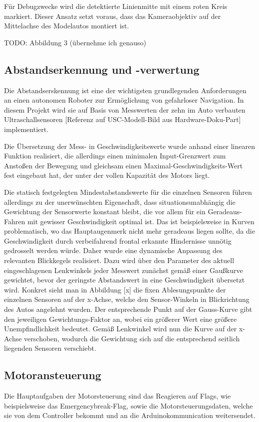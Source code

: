 \documentclass[12pt,a4paper]{report}
\begin{document}
Für Debugzwecke wird die detektierte Linienmitte mit einem roten Kreis markiert.
Dieser Ansatz setzt voraus, dass das Kameraobjektiv auf der Mittelachse des Modelautos montiert ist.

TODO: Abbildung 3 (übernehme ich genauso)
 

\subsection{Abstandserkennung und -verwertung}
Die Abstandserskennung ist eine der wichtigsten grundlegenden Anforderungen an einen autonomen Roboter zur Ermöglichung von gefahrloser Navigation. In diesem Projekt wird sie auf Basis von Messwerten der zehn im Auto verbauten Ultraschallsensoren [Referenz auf USC-Modell-Bild aus Hardware-Doku-Part] implementiert.

Die Übersetzung der Mess- in Geschwindigkeitswerte wurde anhand einer linearen Funktion realisiert, die allerdings einen minimalen Input-Grenzwert zum Anstoßen der Bewegung und gleichsam einen Maximal-Geschwindigkeits-Wert fest eingebaut hat, der unter der vollen Kapazität des Motors liegt.

Die statisch festgelegten Mindestabstandswerte für die einzelnen Sensoren führen allerdings zu der unerwünschten Eigenschaft, dass situationsunabhängig die Gewichtung der Sensorwerte konstant bleibt, die vor allem für ein Geradeaus-Fahren mit gewisser Geschwindigkeit optimal ist. Das ist beispielsweise in Kurven problematisch, wo das Hauptaugenmerk nicht mehr geradeaus liegen sollte, da die Geschwindigkeit durch verbeifahrend frontal erkannte Hindernisse unnötig gedrosselt werden würde. Daher wurde eine dynamische Anpassung des relevanten Blickkegels realisiert. Dazu wird über den Parameter des aktuell eingeschlagenen Lenkwinkels jeder Messwert zunächst gemäß einer Gaußkurve gewichtet, bevor der geringste Abstandswert in eine Geschwindigkeit übersetzt wird. Konkret sieht man in Abbildung [x] die fixen Ablesungspunkte der einzelnen Sensoren auf der x-Achse, welche den Sensor-Winkeln in Blickrichtung des Autos angelehnt wurden. Der entsprechende Punkt auf der Gauss-Kurve gibt den jeweiligen Gewichtungs-Faktor an, wobei ein größerer Wert eine größere Unempfindlichkeit bedeutet. Gemäß Lenkwinkel wird nun die Kurve auf der x-Achse verschoben, wodurch die Gewichtung sich auf die entsprechend seitlich liegenden Sensoren verschiebt.


\subsection{Motoransteuerung}
Die Hauptaufgaben der Motorsteuerung sind das Reagieren auf Flags, wie beispielsweise das Emergencybreak-Flag, sowie die Motorsteuerungsdaten, welche sie von dem Controller bekommt und an die Arduinokommunication weitersendet.
\end{document}
